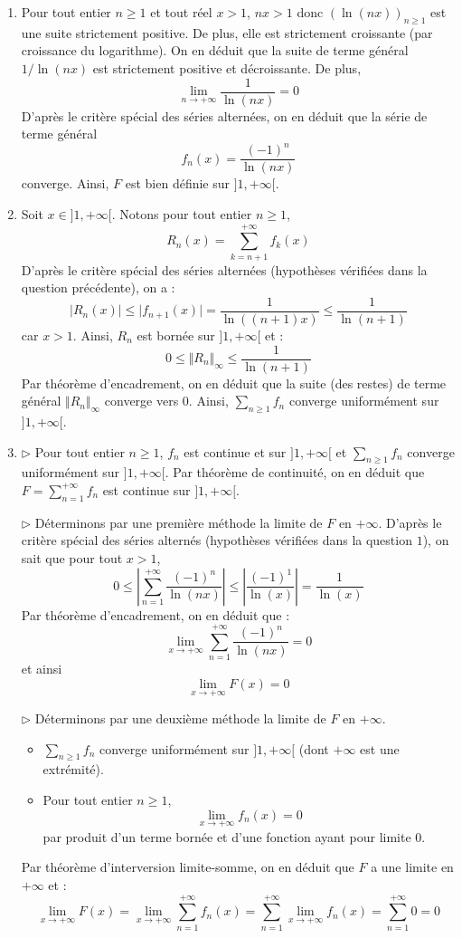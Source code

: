 \documentclass[a4paper,twoside,french,11pt]{VcCours}
\newcommand{\Sum}[2]{\sum_{#1}^{#2}}
\begin{document}
\begin{enumerate}
\item Pour tout entier $n \geq 1$ et tout réel $x>1$, $nx>1$ donc $(\ln(nx))_{n \geq 1}$ est une suite strictement positive. De plus, elle est strictement croissante (par croissance du logarithme). On en déduit que la suite de terme général $1/\ln(nx)$ est strictement positive et décroissante. De plus,
$$ \lim_{n \rightarrow + \infty} \dfrac{1}{\ln(nx)} = 0$$
D'après le critère spécial des séries alternées, on en déduit que la série de terme général 
$$ f_n(x)  =\frac{(-1)^n}{\ln(nx)}$$
converge. Ainsi, $F$ est bien définie sur $]1, + \infty[$.
\item Soit $x \in ]1, + \infty[$. Notons pour tout entier $n \geq 1$,
$$ R_n(x) = \sum_{k=n+1}^{+ \infty} f_k(x)$$
D'après le critère spécial des séries alternées (hypothèses vérifiées dans la question précédente), on a :
$$ \vert R_n(x) \vert \leq \vert f_{n+1}(x) \vert  = \dfrac{1}{\ln((n+1)x)} \leq \dfrac{1}{\ln(n+1)}$$
car $x>1$. Ainsi, $R_n$ est bornée sur $]1, + \infty[$ et :
$$ 0 \leq \Vert R_n \Vert_{\infty} \leq \dfrac{1}{\ln(n+1)}$$
Par théorème d'encadrement, on en déduit que la suite (des restes) de terme général $ \Vert R_n \Vert_{\infty}$ converge vers $0$. Ainsi, $\Sum{n\geq 1}{} f_n$ converge uniformément sur $]1,+\infty[.$ 
\item 

$\rhd$ Pour tout entier $n \geq 1$, $f_n$ est continue et sur $]1, + \infty[$ et $\Sum{n\geq 1}{} f_n$ converge uniformément sur $]1,+\infty[.$ Par théorème de continuité, on en déduit que $F= \Sum{n= 1}{+ \infty} f_n$ est continue sur $]1, + \infty[$.

\medskip

$\rhd$ Déterminons par une première méthode la limite de $F$ en $+ \infty$. D'après le critère spécial des séries alternés (hypothèses vérifiées dans la question $1$), on sait que pour tout $x>1$,
$$ 0 \leq \left\vert \sum_{n=1}^{+ \infty} \dfrac{(-1)^n}{\ln(nx)} \right\vert \leq \left\vert \dfrac{(-1)^1}{\ln(x)} \right\vert = \dfrac{1}{\ln(x)}$$
Par théorème d'encadrement, on en déduit que :
$$ \lim_{x \rightarrow + \infty} \sum_{n=1}^{+ \infty} \dfrac{(-1)^n}{\ln(nx)} = 0$$
et ainsi
$$ \lim_{x \rightarrow + \infty} F(x)= 0$$

\medskip

$\rhd$ Déterminons par une deuxième méthode la limite de $F$ en $+ \infty$.

\begin{itemize}
\item $\Sum{n\geq 1}{} f_n$ converge uniformément sur $]1,+\infty[$ (dont $+ \infty$ est une extrémité).
\item Pour tout entier $n \geq 1$,
$$ \lim_{x \rightarrow + \infty} f_n(x) = 0$$
par produit d'un terme bornée et d'une fonction ayant pour limite $0$.
\end{itemize}
Par théorème d'interversion limite-somme, on en déduit que $F$ a une limite en $+ \infty$ et :
$$ \lim_{x \rightarrow + \infty}  F(x) = \lim_{x \rightarrow + \infty} \sum_{n=1}^{+ \infty} f_n(x) =  \sum_{n=1}^{+ \infty} \lim_{x \rightarrow + \infty} f_n(x)=   \sum_{n=1}^{+ \infty}  0 = 0$$


\end{enumerate}
\end{document}
